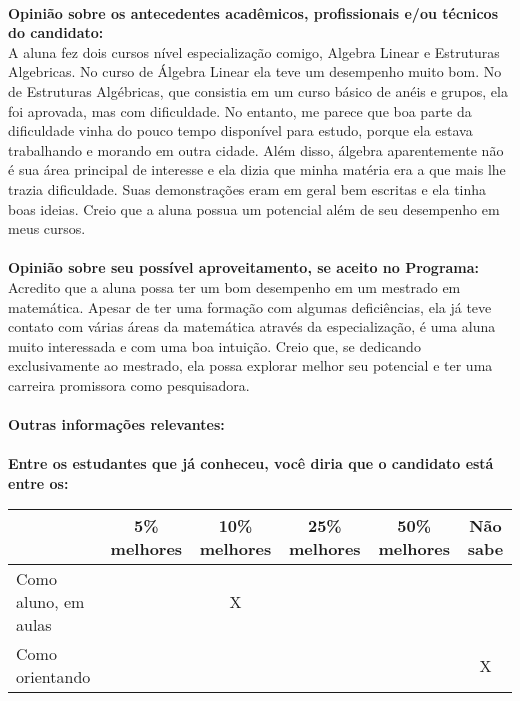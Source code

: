 \documentclass[11pt]{article}
\begin{document}
\\
\textbf{Opinião sobre os antecedentes acadêmicos, profissionais e/ou técnicos do candidato:}
\\A aluna fez dois cursos nível especialização comigo, Algebra Linear e Estruturas Algebricas. No curso de Álgebra Linear ela teve um desempenho muito bom. No de Estruturas Algébricas, que consistia em um curso básico de anéis e grupos, ela foi aprovada, mas com dificuldade. No entanto, me parece que boa parte da dificuldade vinha do pouco tempo disponível para estudo, porque ela estava trabalhando e morando em outra cidade. Além disso, álgebra aparentemente não é sua área principal de interesse e ela dizia que minha matéria era a que mais lhe trazia dificuldade. Suas demonstrações eram em geral bem escritas e ela tinha boas ideias. Creio que a aluna possua um potencial além de seu desempenho em meus cursos.\\
\\
\textbf{Opinião sobre seu possível aproveitamento, se aceito no Programa:}
\\Acredito que a aluna possa ter um bom desempenho em um mestrado em matemática. Apesar de ter uma formação com algumas deficiências, ela já teve contato com várias áreas da matemática através da especialização, é uma aluna muito interessada e com uma boa intuição. Creio que, se dedicando exclusivamente ao mestrado, ela possa explorar melhor seu potencial e ter uma carreira promissora como pesquisadora.\\ 
\\
\textbf{Outras informações relevantes:} \\
\\[0.3cm]
\textbf{Entre os estudantes que já conheceu, você diria que o candidato está entre os:}
\\
\begin{tabular}{|l|c|c|c|c|c|}
\hline
 & 5\% melhores & 10\% melhores & 25\% melhores & 50\% melhores & Não sabe \\
\hline
Como aluno, em aulas &  & X &  &  & \\
\hline
Como orientando &  &  &  &  & X\\
\hline
\end{tabular}
\end{document}
